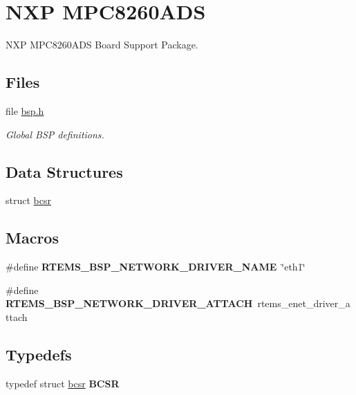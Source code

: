 \hypertarget{group__RTEMSBSPsPowerPCMPC8260ADS}{}\section{N\+XP M\+P\+C8260\+A\+DS}
\label{group__RTEMSBSPsPowerPCMPC8260ADS}


N\+XP M\+P\+C8260\+A\+DS Board Support Package.  


\subsection*{Files}
\begin{DoxyCompactItemize}
\item 
file \mbox{\hyperlink{bsps_2powerpc_2mpc8260ads_2include_2bsp_8h}{bsp.\+h}}
\begin{DoxyCompactList}\small\item\em Global B\+SP definitions. \end{DoxyCompactList}\end{DoxyCompactItemize}
\subsection*{Data Structures}
\begin{DoxyCompactItemize}
\item 
struct \mbox{\hyperlink{structbcsr}{bcsr}}
\end{DoxyCompactItemize}
\subsection*{Macros}
\begin{DoxyCompactItemize}
\item 
\mbox{\label{group__RTEMSBSPsPowerPCMPC8260ADS_ga86d4f9aa98431100692e31068070a8df}} 
\#define {\bfseries R\+T\+E\+M\+S\+\_\+\+B\+S\+P\+\_\+\+N\+E\+T\+W\+O\+R\+K\+\_\+\+D\+R\+I\+V\+E\+R\+\_\+\+N\+A\+ME}~\char`\"{}eth1\char`\"{}
\item 
\mbox{\label{group__RTEMSBSPsPowerPCMPC8260ADS_gadde0d66aef9442971dde465292ac14e6}} 
\#define {\bfseries R\+T\+E\+M\+S\+\_\+\+B\+S\+P\+\_\+\+N\+E\+T\+W\+O\+R\+K\+\_\+\+D\+R\+I\+V\+E\+R\+\_\+\+A\+T\+T\+A\+CH}~rtems\+\_\+enet\+\_\+driver\+\_\+attach
\end{DoxyCompactItemize}
\subsection*{Typedefs}
\begin{DoxyCompactItemize}
\item 
\mbox{\label{group__RTEMSBSPsPowerPCMPC8260ADS_ga8c071b01887d0cdf999c9ffbb0db7c00}} 
typedef struct \mbox{\hyperlink{structbcsr}{bcsr}} {\bfseries B\+C\+SR}
\end{DoxyCompactItemize}
